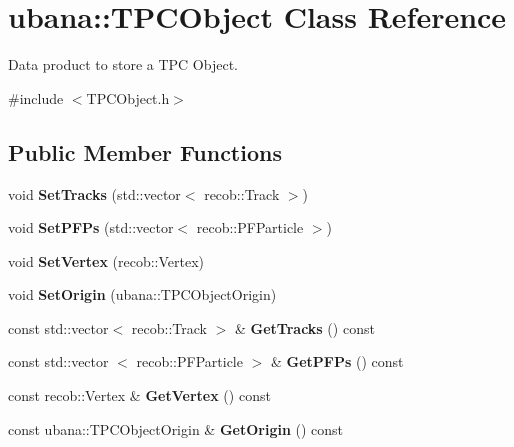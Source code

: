 \hypertarget{classubana_1_1TPCObject}{\section{ubana\-:\-:\-T\-P\-C\-Object \-Class \-Reference}
\label{classubana_1_1TPCObject}
}


\-Data product to store a \-T\-P\-C \-Object.  




{\ttfamily \#include $<$\-T\-P\-C\-Object.\-h$>$}

\subsection*{\-Public \-Member \-Functions}
\begin{DoxyCompactItemize}
\item 
\hypertarget{classubana_1_1TPCObject_a0766c8648ada3d539b474e40a107d8c1}{void {\bfseries \-Set\-Tracks} (std\-::vector$<$ recob\-::\-Track $>$)}\label{classubana_1_1TPCObject_a0766c8648ada3d539b474e40a107d8c1}

\item 
\hypertarget{classubana_1_1TPCObject_ab35b580187ad16cbd53325e8c776f655}{void {\bfseries \-Set\-P\-F\-Ps} (std\-::vector$<$ recob\-::\-P\-F\-Particle $>$)}\label{classubana_1_1TPCObject_ab35b580187ad16cbd53325e8c776f655}

\item 
\hypertarget{classubana_1_1TPCObject_a1fed8d9f87fc301a8cbee484a8434a05}{void {\bfseries \-Set\-Vertex} (recob\-::\-Vertex)}\label{classubana_1_1TPCObject_a1fed8d9f87fc301a8cbee484a8434a05}

\item 
\hypertarget{classubana_1_1TPCObject_ad4946cb455555486b701dd1301a26f56}{void {\bfseries \-Set\-Origin} (ubana\-::\-T\-P\-C\-Object\-Origin)}\label{classubana_1_1TPCObject_ad4946cb455555486b701dd1301a26f56}

\item 
\hypertarget{classubana_1_1TPCObject_a44cc29b00093d89d9f7fe834570d77be}{const std\-::vector$<$ recob\-::\-Track $>$ \& {\bfseries \-Get\-Tracks} () const }\label{classubana_1_1TPCObject_a44cc29b00093d89d9f7fe834570d77be}

\item 
\hypertarget{classubana_1_1TPCObject_a98af6b4a96031938afd18c372cd9d6d6}{const std\-::vector\*
$<$ recob\-::\-P\-F\-Particle $>$ \& {\bfseries \-Get\-P\-F\-Ps} () const }\label{classubana_1_1TPCObject_a98af6b4a96031938afd18c372cd9d6d6}

\item 
\hypertarget{classubana_1_1TPCObject_a3845ae1b31ab6590c5597d157dc01e6a}{const recob\-::\-Vertex \& {\bfseries \-Get\-Vertex} () const }\label{classubana_1_1TPCObject_a3845ae1b31ab6590c5597d157dc01e6a}

\item 
\hypertarget{classubana_1_1TPCObject_a253b4e844b4de1333fa80263c03fceb7}{const ubana\-::\-T\-P\-C\-Object\-Origin \& {\bfseries \-Get\-Origin} () const }\label{classubana_1_1TPCObject_a253b4e844b4de1333fa80263c03fceb7}

\end{DoxyCompactItemize}


